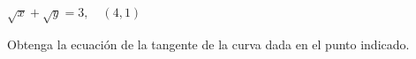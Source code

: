 \item $\sqrt{x} + \sqrt{y} = 3, \quad (4, 1)$
\par
Obtenga la ecuación de la tangente de la curva dada en el punto indicado.
